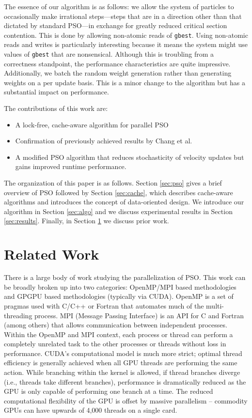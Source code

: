The essence of our algorithm is as follows: we allow the system of particles to occasionally
make irrational steps---steps that are in a direction other than that dictated by
standard PSO---in exchange for greatly reduced critical section contention.
This is done by 
allowing non-atomic reads of \texttt{gbest}. Using non-atomic reads and writes
is particularly interesting because it means the system might use values of
\texttt{gbest} that are nonsensical. Although this is troubling from a
correctness standpoint, the performance characteristics are quite
impressive. Additionally, we batch the random weight generation rather than
generating weights on a per update basis. This is a minor change to the
algorithm but has a substantial impact on performance.

The contributions of this work are:
\begin{itemize}
\item A lock-free, cache-aware algorithm for parallel PSO
\item Confirmation of previously achieved results by Chang et
  al. \cite{cache-pso}
\item A modified PSO algorithm that reduces stochasticity of velocity updates
  but gains improved runtime performance.  
\end{itemize}

The organization of this paper is as follows. Section \ref{sec:pso} gives a
brief overview of PSO followed by Section \ref{sec:cache}, which describes
cache-aware algorithms and introduces the concept of data-oriented design. We
introduce our algorithm in Section \ref{sec:algo} and we discuss experimental
results in Section \ref{sec:results}. Finally, in Section
\ref{sec:prior} we discuss prior work.


\section{Related Work}\label{sec:prior}
There is a large body of work studying the parallelization of PSO. This work can
be broadly broken up into two categories: OpenMP/MPI based methodologies and
GPGPU based methodologies (typically via CUDA). OpenMP is a set of pragmas used
with C/C++ or Fortran that automates much of the multi-threading process. MPI
(Message Passing Interface) is an API for C and Fortran (among others) that
allows communication between independent processes. Within the OpenMP and MPI
context, each process or thread can perform a completely unrelated task to the
other processes or threads without loss in performance. CUDA's computational
model is much more strict; optimal thread efficiency is generally achieved when
all GPU threads are performing the same action. While branching within the
kernel is allowed, if thread branches diverge (i.e., threads take different
branches), performance is dramatically reduced as the GPU is only capable of
performing one branch at a time. The reduced computational flexibility of the
GPU is offset by massive parallelism -- commodity GPUs can have upwards of 4,000
threads on a single card.

